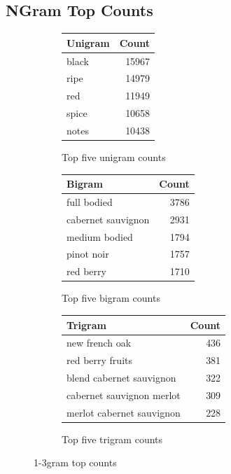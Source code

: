 \documentclass[10pt]{IEEEtran}
\begin{document}
\subsection{NGram Top Counts}
\begin{figure}
    \centering
    \begin{subfigure}[t]{\columnwidth}
        \centering
        \begin{tabular}{ lr  }
            \hline
            Unigram & Count \\
            \hline
            black  & 15967 \\
            ripe   & 14979 \\
            red    & 11949 \\
            spice  & 10658 \\
            notes  & 10438
        \end{tabular}
        \caption{ Top five unigram counts}
    \end{subfigure}
    \begin{subfigure}[t]{\columnwidth}
        \centering
        \begin{tabular}{ lr  }
            \hline
            Bigram & Count \\
            \hline
            full bodied & 3786 \\
            cabernet sauvignon & 2931 \\
            medium bodied & 1794 \\
            pinot noir & 1757 \\
            red berry & 1710
        \end{tabular}
        \caption{ Top five bigram counts}
    \end{subfigure}
    \begin{subfigure}[t]{\columnwidth}
        \centering
        \begin{tabular}{ lr  }
            \hline
            Trigram & Count \\
            \hline
            new french oak  & 436 \\
            red berry fruits & 381 \\
            blend cabernet sauvignon & 322 \\
            cabernet sauvignon merlot & 309 \\
            merlot cabernet sauvignon & 228 
        \end{tabular}
        \caption{ Top five trigram counts}
    \end{subfigure}
    \caption{1-3gram top counts}
    \end{figure}
\end{document}
